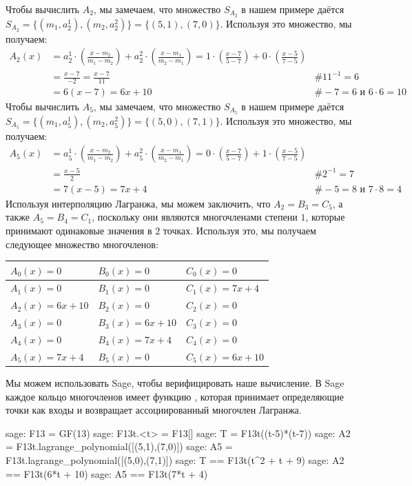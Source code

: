 \begin{example}[3-factorization]
Чтобы вычислить $A_2$, мы замечаем, что множество $S_{A_2}$ в нашем примере даётся $S_{A_2}=\{(m_1,a^1_2), (m_2,a_2^2)\} = \{(5,1), (7,0)\}$. Используя это множество, мы получаем:
\begin{align*}
A_2(x) & = a^1_2\cdot \left(\frac{x-m_2}{m_1-m_2}\right) + a^2_2\cdot\left(\frac{x-m_1}{m_2-m_1}\right)
      = 1\cdot\left(\frac{x-7}{5-7}\right) + 0\cdot\left(\frac{x-5}{7-5}\right) \\
    & = \frac{x-7}{-2}
      = \frac{x-7}{11} & \text{\# } 11^{-1}=6 \\
    & = 6(x-7) 
      = 6x + 10 & \text{\# } -7 = 6 \text{ и } 6\cdot 6 = 10
\end{align*}
Чтобы вычислить $A_5$, мы замечаем, что множество $S_{A_5}$ в нашем примере даётся $S_{A_5}=\{(m_1,a^1_5), (m_2,a^2_5)\} = \{(5,0), (7,1)\}$. Используя это множество, мы получаем:
\begin{align*}
A_5(x) & = a^1_5\cdot\left(\frac{x-m_2}{m_1-m_2}\right) + a^2_5\cdot\left(\frac{x-m_1}{m_2-m_1}\right)
      = 0\cdot\left(\frac{x-7}{5-7}\right) + 1\cdot\left(\frac{x-5}{7-5}\right) \\
    & = \frac{x-5}{2} & \text{\# } 2^{-1}=7 \\
    & = 7(x-5) 
      = 7x + 4 & \text{\# } -5 = 8 \text{ и } 7\cdot 8 = 4
\end{align*}
Используя интерполяцию Лагранжа, мы можем заключить, что $A_2=B_3=C_5$, а также $A_5=B_4=C_1$, поскольку они являются многочленами степени $1$, которые принимают одинаковые значения в $2$ точках. Используя это, мы получаем следующее множество многочленов:
\begin{center}
\begin{tabular}{|l|l|l|}\hline 
$A_{0}(x)=0 $ &$ B_{0}(x)=0   $ & $C_{0}(x)=0$ \tabularnewline\hline 
$A_1(x)=0 $ &$ B_1(x)=0   $ & $C_1(x)=7x+4$ \tabularnewline\hline 
$A_2(x)=6x+10$ &$ B_2(x)=0$ & $C_2(x)=0$ \tabularnewline\hline 
$A_3(x)=0    $ &$ B_3(x)=6x+10$ & $C_3(x)=0$ \tabularnewline\hline 
$A_4(x)=0$ &$ B_4(x)=7x+4  $ & $C_4(x)=0$ \tabularnewline\hline 
$A_5(x)=7x+4$ &$ B_5(x)=0      $ & $C_5(x)=6x+10$ \tabularnewline\hline 
\end{tabular}
\end{center}
Мы можем использовать Sage, чтобы верифицировать наше вычисление. В Sage каждое кольцо многочленов имеет функцию , которая принимает определяющие точки как входы и возвращает ассоциированный многочлен Лагранжа.
\begin{sagecommandline}
sage: F13 = GF(13)
sage: F13t.<t> = F13[]
sage: T = F13t((t-5)*(t-7))
sage: A2 = F13t.lagrange_polynomial([(5,1),(7,0)])
sage: A5 = F13t.lagrange_polynomial([(5,0),(7,1)])
sage: T == F13t(t^2 + t + 9)
sage: A2 == F13t(6*t + 10)
sage: A5 == F13t(7*t + 4)
\end{sagecommandline}


\end{example}
